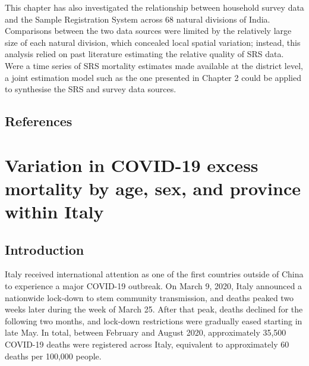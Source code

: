 \documentclass[
]{report}
\begin{document}
This chapter has also investigated the relationship between household survey data and the Sample Registration System across 68 natural divisions of India. Comparisons between the two data sources were limited by the relatively large size of each natural division, which concealed local spatial variation; instead, this analysis relied on past literature estimating the relative quality of SRS data. Were a time series of SRS mortality estimates made available at the district level, a joint estimation model such as the one presented in Chapter 2 could be applied to synthesise the SRS and survey data sources.

\hypertarget{references-3}{%
\section{References}\label{references-3}}

\printbibliography[segment=\therefsegment,heading=none]

\hypertarget{variation-in-covid-19-excess-mortality-by-age-sex-and-province-within-italy}{%
\chapter{Variation in COVID-19 excess mortality by age, sex, and province within Italy}\label{variation-in-covid-19-excess-mortality-by-age-sex-and-province-within-italy}}

\hypertarget{introduction-4}{%
\section{Introduction}\label{introduction-4}}

Italy received international attention as one of the first countries outside of China to experience a major COVID-19 outbreak. On March 9, 2020, Italy announced a nationwide lock-down to stem community transmission, and deaths peaked two weeks later during the week of March 25\autocite{Sebastiani2020}. After that peak, deaths declined for the following two months, and lock-down restrictions were gradually eased starting in late May\autocite{Alicandro2020}. In total, between February and August 2020, approximately 35,500 COVID-19 deaths were registered across Italy, equivalent to approximately 60 deaths per 100,000 people\autocite{InstituteforHealthMetricsandEvaluationIHME2020}.
\end{document}
